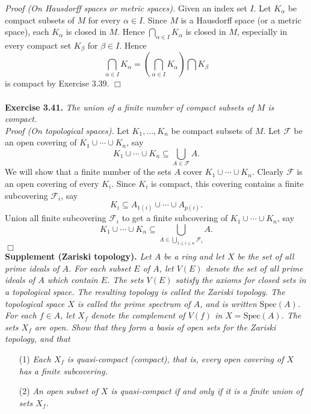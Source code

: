 \documentclass{article}
\begin{document}
\emph{Proof (On Hausdorff spaces or metric spaces).}
Given an index set $I$.
Let $K_\alpha$ be compact subsets of $M$ for every $\alpha \in I$.
Since $M$ is a Hausdorff space (or a metric space),
each $K_\alpha$ is closed in $M$.
Hence
$\bigcap_{\alpha \in I} K_{\alpha}$ is closed in $M$,
especially in every compact set $K_{\beta}$ for $\beta \in I$.
Hence
$$\bigcap_{\alpha \in I} K_{\alpha}
= \left( \bigcap_{\alpha \in I} K_{\alpha} \right) \bigcap K_{\beta}$$
is compact by Exercise 3.39.
$\Box$ \\\\






\textbf{Exercise 3.41.}
\emph{The union of a finite number of compact subsets of $M$ is compact.} \\

\emph{Proof (On topological spaces).}
Let $K_1, \ldots, K_n$ be compact subsets of $M$.
Let $\mathscr{F}$ be an open covering of $K_1 \cup \cdots \cup K_n$, say
$$K_1 \cup \cdots \cup K_n \subseteq \bigcup_{A \in \mathscr{F}}A.$$
We will show that a finite number of the sets $A$ cover $K_1 \cup \cdots \cup K_n$.
Clearly $\mathscr{F}$ is an open covering of every $K_i$.
Since $K_i$ is compact, this covering contains a finite subcovering $\mathscr{F}_i$,
say
$$K_i \subseteq A_{1(i)} \cup \cdots \cup A_{p(i)}.$$
Union all finite subcovering $\mathscr{F}_i$ to get a finite subcovering of
$K_1 \cup \cdots \cup K_n$, say
$$K_1 \cup \cdots \cup K_n \subseteq
\bigcup_{A \in \bigcup_{1 \leq i \leq n} \mathscr{F}_i}A.$$
$\Box$ \\

\textbf{Supplement (Zariski topology).}
\emph{Let $A$ be a ring and let $X$ be the set of all prime ideals of $A$.
For each subset $E$ of $A$,
let $V(E)$ denote the set of all prime ideals of $A$ which contain $E$.
The sets $V(E)$ satisfy
the axioms for closed sets in a topological space.
The resulting topology is called the Zariski topology.
The topological space $X$ is called the prime spectrum of $A$,
and is written $\text{Spec}(A)$.} \\

\emph{For each $f \in A$,
let $X_f$ denote the complement of $V(f)$ in $X = \text{Spec}(A)$.
The sets $X_f$ are open.
Show that they form a basis of open sets for the Zariski topology, and that}
\begin{enumerate}
\item[(1)]
\emph{Each $X_f$ is quasi-compact (compact), that is,
every open covering of $X$ has a finite subcovering.}
\item[(2)]
\emph{An open subset of $X$ is quasi-compact if and only if
it is a finite union of sets $X_f$.} \\
\end{enumerate}
\end{document}
